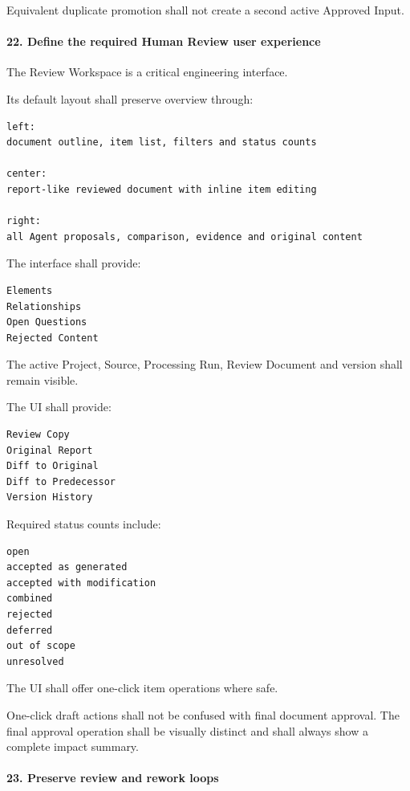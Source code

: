 Equivalent duplicate promotion shall not create a second active Approved Input.

\hypertarget{22-define-the-required-human-review-user-experience}{%
\paragraph{22. Define the required Human Review user experience}\label{22-define-the-required-human-review-user-experience}}

The Review Workspace is a critical engineering interface.

Its default layout shall preserve overview through:

\begin{verbatim}
left:
document outline, item list, filters and status counts

center:
report-like reviewed document with inline item editing

right:
all Agent proposals, comparison, evidence and original content
\end{verbatim}

The interface shall provide:

\begin{verbatim}
Elements
Relationships
Open Questions
Rejected Content
\end{verbatim}

The active Project, Source, Processing Run, Review Document and version shall remain visible.

The UI shall provide:

\begin{verbatim}
Review Copy
Original Report
Diff to Original
Diff to Predecessor
Version History
\end{verbatim}

Required status counts include:

\begin{verbatim}
open
accepted as generated
accepted with modification
combined
rejected
deferred
out of scope
unresolved
\end{verbatim}

The UI shall offer one-click item operations where safe.

One-click draft actions shall not be confused with final document approval. The final approval operation shall be visually distinct and shall always show a complete impact summary.

\hypertarget{23-preserve-review-and-rework-loops}{%
\paragraph{23. Preserve review and rework loops}\label{23-preserve-review-and-rework-loops}}

